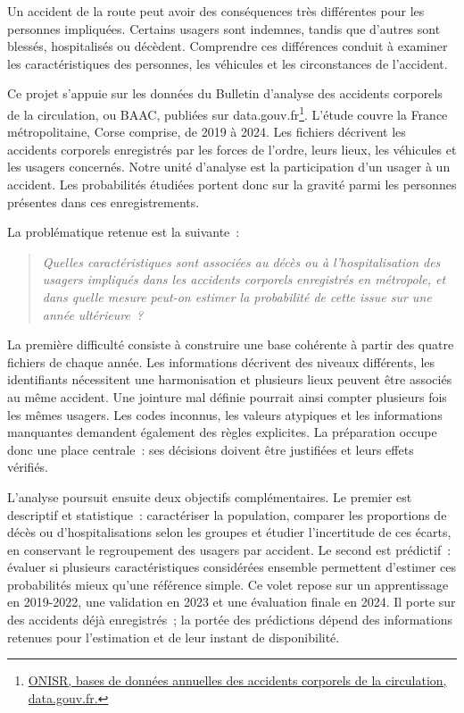 Un accident de la route peut avoir des conséquences très différentes pour les personnes
impliquées. Certains usagers sont indemnes, tandis que
d'autres sont blessés, hospitalisés ou décèdent. Comprendre ces différences conduit
à examiner les caractéristiques des personnes, les véhicules et les circonstances
de l'accident.

Ce projet s'appuie sur les données du Bulletin d'analyse des accidents corporels de la
circulation, ou BAAC, publiées sur
data.gouv.fr\footnote{\href{https://www.data.gouv.fr/datasets/bases-de-donnees-annuelles-des-accidents-corporels-de-la-circulation-routiere-annees-de-2005-a-2024}{ONISR, bases de données annuelles des accidents corporels de la circulation, data.gouv.fr.}}.
L'étude couvre la France métropolitaine, Corse comprise, de 2019 à 2024. Les fichiers
décrivent les accidents corporels enregistrés par les forces de l'ordre, leurs lieux,
les véhicules et les usagers concernés. Notre unité d'analyse est la participation d'un
usager à un accident. Les probabilités étudiées portent donc sur la gravité parmi les
personnes présentes dans ces enregistrements.

La problématique retenue est la suivante~:
\begin{quote}
\itshape
Quelles caractéristiques sont associées au décès ou à l'hospitalisation des usagers
impliqués dans les accidents corporels enregistrés en métropole, et dans quelle mesure
peut-on estimer la probabilité de cette issue sur une année ultérieure~?
\end{quote}

La première difficulté consiste à construire une base cohérente à partir des quatre
fichiers de chaque année. Les informations décrivent des niveaux différents, les
identifiants nécessitent une harmonisation et plusieurs lieux peuvent être associés
au même accident. Une jointure mal définie pourrait ainsi compter plusieurs fois les
mêmes usagers. Les codes inconnus, les valeurs atypiques et les informations manquantes
demandent également des règles explicites. La préparation occupe donc une place centrale~:
ses décisions doivent être justifiées et leurs effets vérifiés.

L'analyse poursuit ensuite deux objectifs complémentaires. Le premier est descriptif
et statistique~: caractériser la population, comparer les proportions de décès ou
d'hospitalisations selon les groupes et étudier l'incertitude de ces écarts, en conservant
le regroupement des usagers par accident. Le second est prédictif~: évaluer si plusieurs
caractéristiques considérées ensemble permettent d'estimer ces probabilités mieux
qu'une référence simple. Ce volet repose sur un apprentissage
en 2019-2022, une validation en 2023 et une évaluation finale en 2024. Il porte sur
des accidents déjà enregistrés~; la portée des prédictions dépend des informations
retenues pour l'estimation et de leur instant de disponibilité.

